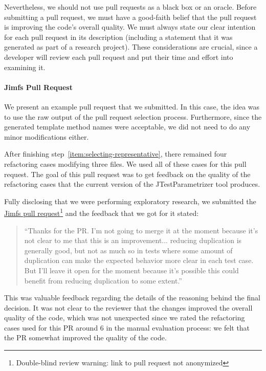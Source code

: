 
Nevertheless, we should not use pull requests as a black box or an oracle. Before submitting a pull request, we must have a good-faith belief that the pull request is improving the code's overall quality. We must always state our clear intention for each pull request in its description (including a statement that it was generated as part of a research project). These considerations are crucial, since a developer will review each pull request and put their time and effort into examining it. 

\paragraph{Jimfs Pull Request}
We present an example pull request that we submitted. In this case, the idea was to use the raw output of the pull request selection process. Furthermore, since the generated template method names were acceptable, we did not need to do any minor modifications either.

After finishing step~\ref{item:selecting-representative}, there remained four refactoring cases modifying three files. We used all of these cases for this pull request. The goal of this pull request was to get feedback on the quality of the refactoring cases that the current version of the JTestParametrizer tool produces.

Fully disclosing that we were performing exploratory research, we submitted the \href{https://github.com/google/jimfs/pull/159}{Jimfs pull request}\footnote{Double-blind review warning: link to pull request not anonymized} and the feedback that we got for it stated: \begin{quote}``Thanks for the PR. I'm not going to merge it at the moment because it's not clear to me that this is an improvement... reducing duplication is generally good, but not as much so in tests where some amount of duplication can make the expected behavior more clear in each test case. But I'll leave it open for the moment because it's possible this could benefit from reducing duplication to some extent.''\end{quote}

This was valuable feedback regarding the details of the reasoning behind the final decision. It was not clear to the reviewer that the changes improved the overall quality of the code, which was not unexpected since we rated the refactoring cases used for this PR around 6 in the manual evaluation process: we felt that the PR somewhat improved the quality of the code. 

